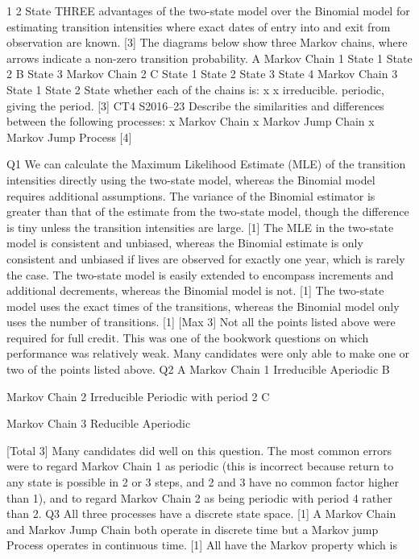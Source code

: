 1
2
State THREE advantages of the two-state model over the Binomial model for
estimating transition intensities where exact dates of entry into and exit from
observation are known.
[3]
The diagrams below show three Markov chains, where arrows indicate a non-zero
transition probability.
A
Markov Chain 1
State 1
State 2
B
State 3
Markov Chain 2
C
State 1 State 2
State 3 State 4
Markov Chain 3
State 1
State 2
State whether each of the chains is:
x
x
irreducible.
periodic, giving the period.
[3]
CT4 S2016–23
Describe the similarities and differences between the following processes:
x Markov Chain
x Markov Jump Chain
x Markov Jump Process
[4]

Q1
We can calculate the Maximum Likelihood Estimate (MLE) of the transition intensities
directly using the two-state model, 
whereas the Binomial model requires additional assumptions. 
The variance of the Binomial estimator is greater than that of the estimate from the two-state
model, though the difference is tiny unless the transition intensities are large.
[1]
The MLE in the two-state model is consistent and unbiased, 
whereas the Binomial estimate is only consistent and unbiased if lives are observed for
exactly one year, which is rarely the case. 
The two-state model is easily extended to encompass increments and additional decrements,
whereas the Binomial model is not.
[1]
The two-state model uses the exact times of the transitions, whereas the Binomial model only
uses the number of transitions.
[1]
[Max 3]
Not all the points listed above were required for full credit. This was one of the
bookwork questions on which performance was relatively weak. Many
candidates were only able to make one or two of the points listed above.
Q2
A
Markov Chain 1
Irreducible
Aperiodic
B


Markov Chain 2
Irreducible
Periodic with period 2
C


Markov Chain 3
Reducible
Aperiodic


[Total 3]
Many candidates did well on this question. The most common errors were to
regard Markov Chain 1 as periodic (this is incorrect because return to any
state is possible in 2 or 3 steps, and 2 and 3 have no common factor higher
than 1), and to regard Markov Chain 2 as being periodic with period 4 rather
than 2.
Q3
All three processes have a discrete state space.
[1]
A Markov Chain and Markov Jump Chain both operate in discrete time but a Markov jump
Process operates in continuous time.
[1]
All have the Markov property which is

